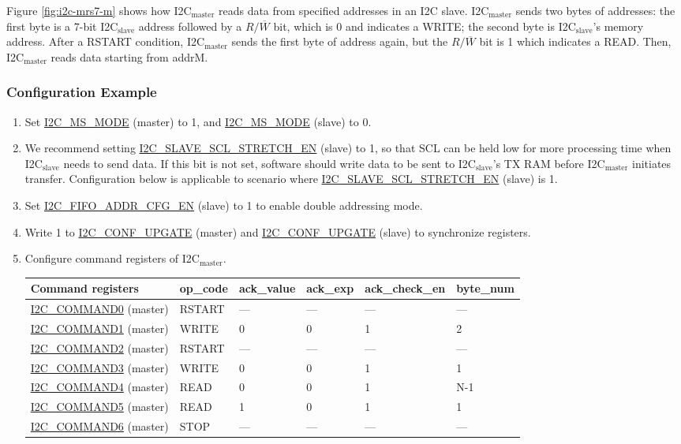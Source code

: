 \documentclass[main\_\_EN.tex]{subfiles}
\begin{document}
Figure \ref{fig:i2c-mrs7-m} shows how I2C$_\text{master}$ reads data from specified addresses in an I2C slave. I2C$_\text{master}$ sends two bytes of addresses: the first byte is a 7-bit I2C$_\text{slave}$ address followed by a $R/\overline W$ bit, which is 0 and indicates a WRITE; the second byte is I2C$_\text{slave}$'s memory address. After a RSTART condition, I2C$_\text{master}$ sends the first byte of address again, but the $R/\overline W$ bit is 1 which indicates a READ. Then, I2C$_\text{master}$ reads data starting from addrM.

\subsubsection{Configuration Example}
\begin{enumerate}
\item Set \hyperref[fielddesc:I2CMSMODE]{I2C\_MS\_MODE} (master) to 1, and \hyperref[fielddesc:I2CMSMODE]{I2C\_MS\_MODE} (slave) to 0.
\item We recommend setting \hyperref[fielddesc:I2CSLAVESCLSTRETCHEN]{I2C\_SLAVE\_SCL\_STRETCH\_EN} (slave) to 1, so that SCL can be held low for more processing time when I2C$_\text{slave}$ needs to send data. If this bit is not set, software should write data to be sent to I2C$_\text{slave}$'s TX RAM before I2C$_\text{master}$ initiates transfer. Configuration below is applicable to scenario where \hyperref[fielddesc:I2CSLAVESCLSTRETCHEN]{I2C\_SLAVE\_SCL\_STRETCH\_EN} (slave) is 1. 
\item  Set \hyperref[fielddesc:I2CFIFOADDRCFGEN]{I2C\_FIFO\_ADDR\_CFG\_EN} (slave) to 1 to enable double addressing mode.
\item Write 1 to \hyperref[fielddesc:I2CCONFUPGATE]{I2C\_CONF\_UPGATE} (master) and \hyperref[fielddesc:I2CCONFUPGATE]{I2C\_CONF\_UPGATE} (slave) to synchronize registers.
\item Configure command registers of I2C$_\text{master}$.
\begin{longtable}{ | p{4cm} | p{2cm} | p{2cm} | p{2cm} |p{2cm} | p{2cm} |}
\hline\rowcolor{lightgray}
Command registers & op\_code & ack\_value&ack\_exp&ack\_check\_en&byte\_num  \\ \hline
\hyperref[fielddesc:I2CCOMMAND0]{I2C\_COMMAND0} (master)& RSTART& ---&---&---&---  \\ \hline
\hyperref[fielddesc:I2CCOMMAND1]{I2C\_COMMAND1} (master)& WRITE& 0&0&1&2  \\ \hline
\hyperref[fielddesc:I2CCOMMAND2]{I2C\_COMMAND2} (master)& RSTART& ---&---&---&---  \\ \hline
\hyperref[fielddesc:I2CCOMMAND3]{I2C\_COMMAND3} (master)& WRITE& 0&0&1&1  \\ \hline
\hyperref[fielddesc:I2CCOMMAND4]{I2C\_COMMAND4} (master)& READ& 0&0&1&N-1  \\ \hline
\hyperref[fielddesc:I2CCOMMAND5]{I2C\_COMMAND5} (master)& READ& 1&0&1&1  \\ \hline
\hyperref[fielddesc:I2CCOMMAND6]{I2C\_COMMAND6} (master)& STOP& ---&---&---&---  \\ \hline
\end{longtable}


\end{enumerate}
\end{document}
